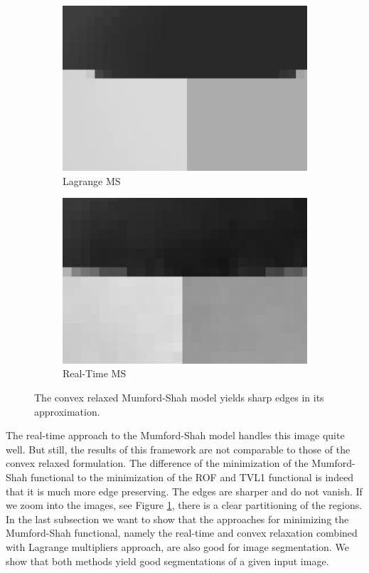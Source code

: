 \documentclass[abstracton]{scrreprt}
\begin{document}
\begin{figure}[!ht]
\begin{subfigure}[b]{0.29\textwidth}
                    \includegraphics[width=\textwidth]{img/zoomed/gauss_noise_ms_zoomed.png}
                    \caption{Lagrange MS}
                \end{subfigure}
                \begin{subfigure}[b]{0.29\textwidth}
                    \includegraphics[width=\textwidth]{img/zoomed/gauss_noise_rt_zoomed.png}
                    \caption{Real-Time MS}
                \end{subfigure}
                \caption[Gauss denoising comparison of several models with zooming into images.]{The convex relaxed Mumford-Shah model yields sharp edges in its approximation.}
            \label{fig:synth_gauss_compare_zoomed}
            \end{figure}
            The real-time approach to the Mumford-Shah model handles this image quite well. But still, the results of this framework are not comparable to those of the convex relaxed formulation. The difference of the minimization of the Mumford-Shah functional to the minimization of the ROF and TVL1 functional is indeed that it is much more edge preserving. The edges are sharper and do not vanish. If we zoom into the images, see Figure \ref{fig:synth_gauss_compare_zoomed}, there is a clear partitioning of the regions. In the last subsection we want to show that the approaches for minimizing the Mumford-Shah functional, namely the real-time and convex relaxation combined with Lagrange multipliers approach, are also good for image segmentation. We show that both methods yield good segmentations of a given input image.
\end{document}
